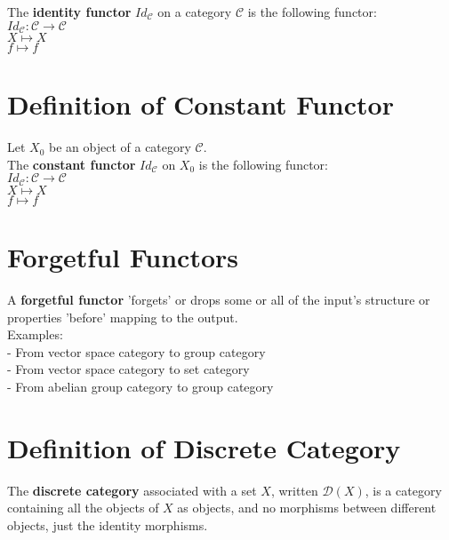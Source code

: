 \documentclass[a4paper, twoside, english, 11pt]{book}
\newcommand{\C}{\mathcal C}
\newcommand{\D}{\mathcal D}
\begin{document}
The \textbf{identity functor} $Id_\C$ on a category $\C$ is the following functor: \\

$Id_\C : \C \rightarrow \C$\\
\indent
$X \mapsto X$ \\
\indent
$f \mapsto f$



\section{Definition of Constant Functor}

Let $X_0$ be an object of a category $\C$. \\
The \textbf{constant functor} $Id_\C$ on $X_0$ is the following functor: \\

$Id_\C : \C \rightarrow \C$\\
\indent
$X \mapsto X$ \\
\indent
$f \mapsto f$



\section{Forgetful Functors}

A \textbf{forgetful functor} 'forgets' or drops some or all of the input's structure or properties 'before' mapping to the output. \\

\noindent
Examples: \\

- From vector space category to group category \\

- From vector space category to set category \\

- From abelian group category to group category



\section{Definition of Discrete Category}

The \textbf{discrete category} associated with a set $X$, written $\D(X)$, is a category containing all the objects of $X$ as objects, and no morphisms between different objects, just the identity morphisms.
\end{document}
